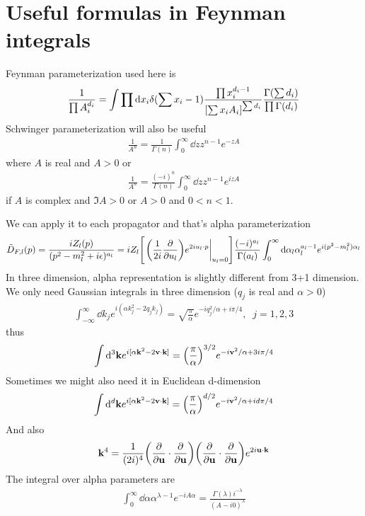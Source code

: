\documentclass[aps,prd,preprint,showkeys,10pt]{revtex4-1}
\newcommand{\vbk}{\vb{k}}
\renewcommand{\a}{\alpha}
\newcommand{\la}{\lambda}
\begin{document}
\section{Useful formulas in Feynman integrals}
Feynman parameterization used here is
\begin{align}
	\frac{1}{\prod A_i^{d_i}}=\int\prod \dd x_i \delta(\sum x_i-1)\frac{\prod x_i^{d_i-1}}{\bqty{\sum x_iA_i}^{\sum d_i}}\frac{\Gamma(\sum d_i)}{\prod\Gamma(d_i)}
	\label{FEYNMANPARA}
\end{align}
Schwinger parameterization will also be useful
\begin{align}
	\frac{1}{A^n}=\frac{1}{\Gamma{(n)}}\int_0^\infty\dd z z^{n-1}e^{-zA}
\end{align}
where $A$ is real and $A>0$ or
\begin{align}
	\frac{1}{A^n}=\frac{(-i)^{n}}{\Gamma{(n)}}\int_0^\infty\dd z z^{n-1}e^{izA}
\end{align}
if $A$ is complex and $\Im A>0$ or $A>0$ and $0<n<1$.

We can apply it to each propagator and that's alpha parameterization\cite{Smirnov2006}
\begin{align}
	\tilde D_{F,l}(p)=\frac{iZ_l(p)}{(p^2-m_l^2+i\epsilon)^{a_l}}=iZ_l\bqty{\eval{\pqty{\frac{1}{2i}\pdv{u_l}}e^{2iu_l\cdot p}}_{u_l=0}}\frac{(-i)^{a_l}}{\Gamma{(a_l)}}\int_0^{\infty}\dd \a_l \a_l^{a_l-1}e^{i(p^2-m_l^2)\a_l}
	\label{ALPHAPARA}
\end{align}
In three dimension, alpha representation is slightly different from 3+1 dimension. We only need Gaussian integrals in three dimension ($q_j$ is real and $\a>0$)
\begin{align}
	\int_{-\infty}^{\infty}\dd k_je^{i(\a k_j^2-2q_jk_j)}=\sqrt{\frac{\pi}{\a}}e^{-iq_j^2/\a+i\pi/4},\;\;j=1,2,3
\end{align}
thus
\begin{align}
	\int\dd^3\vbk e^{i[\a \vbk^2-2 \vb{v}\cdot \vbk]}=\pqty{\frac{\pi}{\a}}^{3/2}e^{-i\vb{v}^2/\a+3i\pi/4}
\end{align}
Sometimes we might also need it in Euclidean d-dimension
\begin{align}
	\int\dd^d\vbk e^{i[\a \vbk^2-2 \vb{v}\cdot \vbk]}=\pqty{\frac{\pi}{\a}}^{d/2}e^{-i\vb{v}^2/\a+id\pi/4}
\end{align}
And also
\begin{align*}
	\vbk^4=\frac{1}{(2i)^4}\pqty{\pdv{\vb{u}}\cdot\pdv{\vb{u}}}\pqty{\pdv{\vb{u}}\cdot\pdv{\vb{u}}}e^{2i\vb{u}\cdot\vbk}
\end{align*}
The integral over alpha parameters are
\begin{align*}
	\int_0^{\infty}\dd \a \a^{\la-1}e^{-i A \a}=\frac{\Gamma(\la)i^{-\la}}{(A-i0)^{\la}}
\end{align*}
\end{document}
